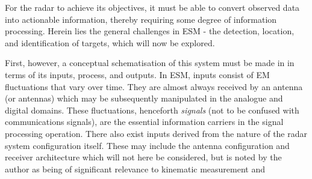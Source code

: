 
For the radar to achieve its objectives, it must be able to convert observed data into actionable information, thereby requiring some degree of information processing. Herein lies the general challenges in ESM - the detection, location, and identification of targets, which will now be explored. %

First, however, a conceptual schematisation of this system must be made in in terms of its inputs, process, and outputs. In ESM, inputs consist of EM fluctuations that vary over time. They are almost always received by an antenna (or antennas) which may be subsequently manipulated in the analogue and digital domains. These fluctuations, henceforth \textit{signals} (not to be confused with communications signals), are the essential information carriers in the signal processing operation. There also exist inputs derived from the nature of the radar system configuration itself. These may include the antenna configuration and receiver architecture which will not here be considered, but is noted by the author as being of significant relevance to kinematic measurement and 



